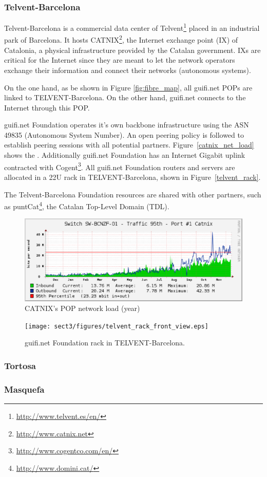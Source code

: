 \subsubsection{Telvent-Barcelona}

Telvent-Barcelona is a commercial data center of Telvent\footnote{\url{http://www.telvent.es/en/}} placed in an industrial park of Barcelona. It hosts CATNIX\footnote{\url{http://www.catnix.net}}, the Internet exchange point (IX) of Catalonia, a physical infrastructure provided by the Catalan government. IXs are critical for the Internet since they are meant to let the network operators exchange their information and connect their networks (autonomous systems). 

On the one hand, as be shown in Figure \ref{fig:fibre_map}, all guifi.net POPs are linked to TELVENT-Barcelona. On the other hand, guifi.net connects to the Internet through this POP.

guifi.net Foundation operates it's own backbone infrastructure using the ASN 49835 (Autonomous System Number). 
An open peering policy is followed to establish peering sessions with all potential partners.
Figure~\ref{catnix_net_load} shows the . Additionally guifi.net Foundation has an Internet Gigabit uplink contracted with Cogent\footnote{\url{http://www.cogentco.com/en/}}. All guifi.net Foundation routers and servers are allocated in a 22U rack in TELVENT-Barcelona, shown in Figure~\ref{telvent_rack}. 

The Telvent-Barcelona Foundation resources are shared with other partners, such as puntCat\footnote{\url{http://www.domini.cat/}}, the Catalan Top-Level Domain (TDL).

\begin{figure}[htbp]
  \centering
  \includegraphics[scale=.65]{sect3/figures/catnix_network_load_year.eps} 
  \caption{CATNIX's POP network load (year)}
  \label{fig:catnix_net_load}
\end{figure}


\begin{figure}[htbp]
  \centering
  \texttt{[image: sect3/figures/telvent\_rack\_front\_view.eps]} 
  \caption{guifi.net Foundation rack in TELVENT-Barcelona.}
  \label{fig:telvent_rack}
\end{figure}




\subsubsection{Tortosa}


\subsubsection{Masquefa}

